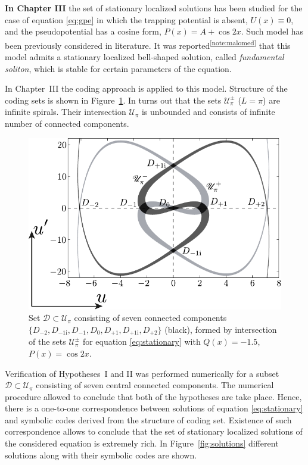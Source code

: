 \documentclass[candidate, href, colorlinks]{disser}
\begin{document}
\textbf{In Chapter III} the set of stationary localized solutions has been studied for the case of equation \eqref{eq:gpe} in which the trapping potential is absent, $U(x) \equiv 0$, and the pseudopotential has a cosine form, $P(x) = A + \cos 2x$.
Such model has been previously considered in literature.
It was reported\textsuperscript{\ref{note:malomed}} that this model admits a stationary localized bell-shaped solution, called {\it fundamental soliton}, which is stable for certain parameters of the equation.

In Chapter~III the coding approach is applied to this model.
Structure of the coding sets is shown in Figure~\ref{fig:island-set}.
In turns out that the sets $\mathscr{U}_{\pi}^{\pm}$ ($L = \pi$) are infinite spirals.
Their intersection $\mathscr{U}_{\pi}$ is unbounded and consists of infinite number of connected components.

\begin{figure}[h]
\centering
	\includegraphics[scale = 1]{../pic/island set to check hypotheses for cosine equation}
	\caption{
		Set $\mathcal{D} \subset \mathscr{U}_{\pi}$ consisting of seven connected components $\{ D_{-2}, D_{-1\mathrm{i}}, D_{-1}, D_0, D_{+1}, D_{+1\mathrm{i}}, D_{+2} \}$ (black), formed by intersection of the sets $\mathscr{U}_{\pi}^{\pm}$ for equation \eqref{eq:stationary} with $Q(x) = -1.5$, $P(x) = \cos 2x$.
	}
\label{fig:island-set}
\end{figure}

Verification of Hypotheses~I and II was performed numerically for a subset $\mathcal{D} \subset \mathscr{U}_{\pi}$ consisting of seven central connected components.
The numerical procedure allowed to conclude that both of the hypotheses are take place.
Hence, there is a one-to-one correspondence between solutions of equation \eqref{eq:stationary} and symbolic codes derived from the structure of coding set.
Existence of such correspondence allows to conclude that the set of stationary localized solutions of the considered equation is extremely rich.
In Figure~\ref{fig:solutions} different solutions along with their symbolic codes are shown.
\end{document}
